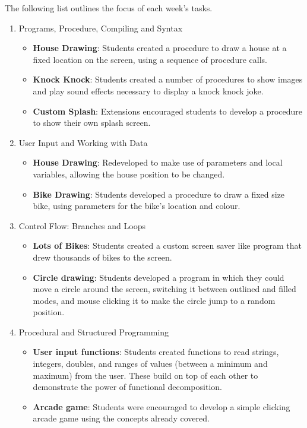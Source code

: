 The following list outlines the focus of each week's tasks.
\begin{enumerate}
  \item Programs, Procedure, Compiling and Syntax
  \begin{itemize}[noitemsep,nolistsep]
  	\item \textbf{House Drawing}: Students created a procedure to draw a house at a fixed location on the screen, using a sequence of procedure calls. 
  	\item \textbf{Knock Knock}: Students created a number of procedures to show images and play sound effects necessary to display a knock knock joke.
  	\item \textbf{Custom Splash}: Extensions encouraged students to develop a procedure to show their own splash screen.
  \end{itemize}
  \item User Input and Working with Data
  \begin{itemize}[noitemsep,nolistsep]
  	\item \textbf{House Drawing}: Redeveloped to make use of parameters and local variables, allowing the house position to be changed.
  	\item \textbf{Bike Drawing}: Students developed a procedure to draw a fixed size bike, using parameters for the bike's location and colour.
  \end{itemize}
  \item Control Flow: Branches and Loops
  \begin{itemize}[noitemsep,nolistsep]
  	\item \textbf{Lots of Bikes}: Students created a custom screen saver like program that drew thousands of bikes to the screen.
  	\item \textbf{Circle drawing}: Students developed a program in which they could move a circle around the screen, switching it between outlined and filled modes, and mouse clicking it to make the circle jump to a random position.
  \end{itemize}
  \item Procedural and Structured Programming
  \begin{itemize}[noitemsep,nolistsep]
  	\item \textbf{User input functions}: Students created functions to read strings, integers, doubles, and ranges of values (between a minimum and maximum) from the user. These build on top of each other to demonstrate the power of functional decomposition.
  	\item \textbf{Arcade game}: Students were encouraged to develop a simple clicking arcade game using the concepts already covered.

\end{itemize}
\end{enumerate}
